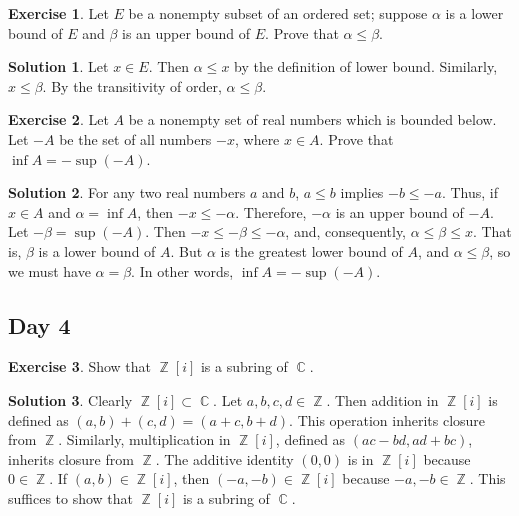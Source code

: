 \documentclass{article}
\theoremstyle{definition}
\newtheorem{exercise}{Exercise}
\newtheorem*{solution}{Solution}
\DeclareMathOperator{\Z}{\mathbb{Z}}
\DeclareMathOperator{\C}{\mathbb{C}}
\begin{document}
\begin{exercise}
    Let \(E\) be a nonempty subset of an ordered set; suppose \(\alpha\) is a lower bound of \(E\) and \(\beta\) is an upper bound of \(E\). Prove that \(\alpha\leq\beta\).
\end{exercise}
\begin{solution}
    Let \(x\in E\). Then \(\alpha\leq x\) by the definition of lower bound. Similarly, \(x\leq\beta\). By the transitivity of order, \(\alpha\leq\beta\).
\end{solution}

\begin{exercise}
    Let \(A\) be a nonempty set of real numbers which is bounded below. Let \(-A\) be the set of all numbers \(-x\), where \(x\in A\). Prove that \(\inf A=-\sup(-A)\).
\end{exercise}
\begin{solution}
    For any two real numbers \(a\) and \(b\), \(a\leq b\) implies \(-b\leq -a\). Thus, if \(x\in A\) and \(\alpha=\inf A\), then \(-x\leq-\alpha\). Therefore, \(-\alpha\) is an upper bound of \(-A\). Let \(-\beta=\sup(-A)\). Then \(-x\leq-\beta\leq-\alpha\), and, consequently, \(\alpha\leq\beta\leq x\). That is, \(\beta\) is a lower bound of \(A\). But \(\alpha\) is the greatest lower bound of \(A\), and \(\alpha\leq\beta\), so we must have \(\alpha=\beta\). In other words, \(\inf A=-\sup(-A)\).
\end{solution}

\subsection{Day 4}
\begin{exercise}
    Show that \(\Z[i]\) is a subring of \(\C\).
\end{exercise}
\begin{solution}
    Clearly \(\Z[i]\subset\C\). Let \(a,b,c,d\in\Z\). Then addition in \(\Z[i]\) is defined as \((a,b)+(c,d)=(a+c,b+d)\). This operation inherits closure from \(\Z\). Similarly, multiplication in \(\Z[i]\), defined as \((ac-bd,ad+bc)\), inherits closure from \(\Z\). The additive identity \((0,0)\) is in \(\Z[i]\) because \(0\in\Z\). If \((a,b)\in\Z[i]\), then \((-a,-b)\in\Z[i]\) because \(-a,-b\in\Z\). This suffices to show that \(\Z[i]\) is a subring of \(\C\).
\end{solution}
\end{document}

